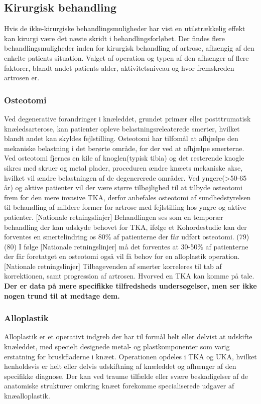 \subsection{Kirurgisk behandling}

Hvis de ikke-kirurgiske behandlingsmuligheder har vist en utilstrækkelig effekt kan kirurgi være det næste skridt i behandlingsforløbet.  Der findes flere behandlingsmuligheder inden for kirurgisk behandling af artrose, afhængig af den enkelte patients situation. Valget af operation og typen af den afhænger af flere faktorer, blandt andet patients alder, aktivitetsniveau og hvor fremskreden artrosen er.

\subsubsection{Osteotomi}
Ved degenerative forandringer i knæleddet, grundet primær eller postttrumatisk knæledsarterose, kan patienter opleve belastningsreleaterede smerter, hvilket blandt andet kan skyldes fejlstilling. Osteotomi har tilfomål at afhjælpe den mekaniske belastning i det berørte område, for der ved at afhjælpe smerterne. Ved osteotomi fjernes en kile af knoglen(typisk tibia) og det resterende knogle sikres med skruer og metal plader, proceduren ændre knæets mekaniske akse, hvilket vil ændre belastningen af de degenererede områder.\citep{Osteotomi_og_TKA} Ved yngere(>50-65 år)\citep{Osteotomi_og_TKA} og aktive patienter vil der være større tilbøjlighed til at tilbyde osteotomi frem for den mere invasive TKA, derfor anbefales osteotomi af sundhedstyrelsen til behandling af mildere former for artrose med fejlstilling hos yngre og aktive patienter. [Nationale retningslinjer] Behandlingen ses som en temporær behandling der kan udskyde behovet for TKA, ifølge et Kohordestudie kan der forventes en smertelindring os 80\% af patienterne der får udført osteotomi. (79)(80) I følge [Nationale retningslinjer] må det forventes at 30-50\% af patienterne der får foretatget en osteotomi også vil få behov for en alloplastik operation. [Nationale retningslinjer] Tilbagevenden af smerter korreleres til tab af korrektionen, samt progression af artrosen. Hvorved en TKA kan komme på tale. \citep{Osteotomi_og_TKA} \textbf{Der er data på mere specifikke tilfredsheds undersøgelser, men ser ikke nogen trund til at medtage dem. }

\subsubsection{Alloplastik}
Alloplastik er et operativt indgreb der har til formål helt eller delvist at udskifte knæleddet, med specielt designede metal- og plastkomponenter som varig erstatning for bruskfladerne i knæet. Operationen opdeles i TKA og UKA, hvilket henholdsvis er helt eller delvis udskiftning af knæleddet og afhænger af den specifikke diagnose. Der kan ved traume tilfælde eller svære beskadigelser af de anatomiske strukturer omkring knæet forekomme specialiserede udgaver af knæalloplastik.

